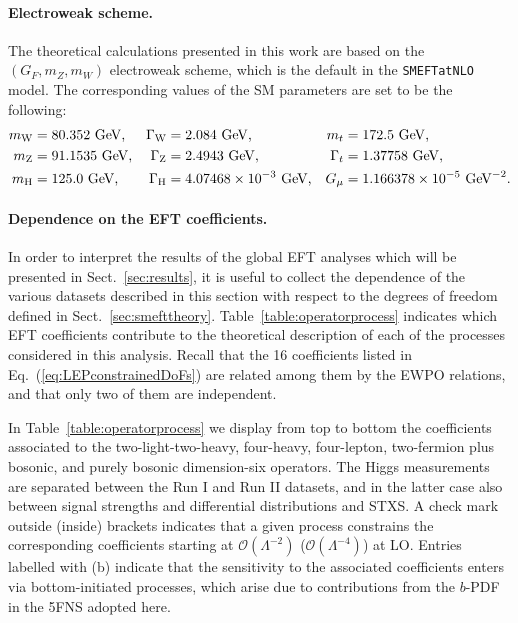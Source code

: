 

{ 
\paragraph{Electroweak scheme.}
%
The theoretical calculations presented
in this work are based on
the $(G_F, m_Z, m_W)$ electroweak scheme,
which is the default in the
{\tt SMEFTatNLO} model.
%
The corresponding values of the SM parameters are
set to be the following:
  \begin{equation}
\begin{aligned}
     m_\mathrm{W}  &= 80.352~{\rm GeV} \text{,} &
\Gamma_\mathrm{W}  &= 2.084~{\rm GeV} \text{,} &
     m_t           &= 172.5~{\rm GeV} \text{,} \\
m_\mathrm{Z}       &= 91.1535~{\rm GeV} \text{,} &
\Gamma_\mathrm{Z}  &= 2.4943~{\rm GeV} \text{,} &
\Gamma_t           &= 1.37758~{\rm GeV} \text{,} \\
m_\mathrm{H}       &= 125.0~{\rm GeV} \text{,} &
\Gamma_\mathrm{H}  &= 4.07468 \times 10^{-3}~{\rm GeV} \text{,} &
G_\mu              &= 1.166378 \times 10^{-5}~{\rm GeV}^{-2} \text{.}
\end{aligned}
\end{equation}
}

\paragraph{Dependence on the EFT coefficients.}
%
In order to interpret the results of the global EFT analyses
which will be presented in Sect.~\ref{sec:results},
it is useful to collect the dependence
of the various datasets described
in this section with respect to the degrees
of freedom defined in Sect.~\ref{sec:smefttheory}.
%
Table~\ref{table:operatorprocess} indicates
which EFT coefficients contribute to the theoretical description of each of the
processes considered in this analysis.
%
Recall that the 16 coefficients listed in Eq.~(\ref{eq:LEPconstrainedDoFs}) are related
among them by the EWPO relations, and that only two of them are independent.

In Table~\ref{table:operatorprocess} we display
from top to bottom the coefficients associated to
the  two-light-two-heavy, four-heavy, four-lepton, two-fermion plus bosonic,
and purely bosonic dimension-six operators.
%
The Higgs measurements are separated between the Run I and Run II datasets,
and in the latter case also between signal strengths and differential
distributions and STXS.
%
A check mark outside (inside) brackets indicates that a given
process constrains the corresponding coefficients
starting at $\mathcal{O}( \Lambda^{-2})$ 
($\mathcal{O}( \Lambda^{-4})$) at LO.
%
Entries labelled with (b) indicate that the sensitivity
to the associated coefficients enters via bottom-initiated
processes, which arise due to contributions from the $b$-PDF
in the 5FNS adopted here.

